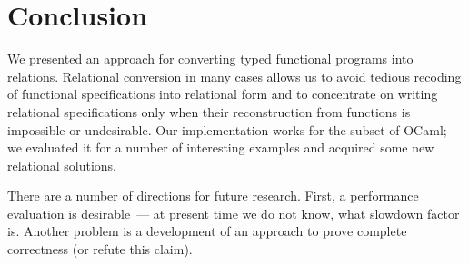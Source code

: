 \section{Conclusion}
\label{conclusion}

We presented an approach for converting typed functional programs into relations. Relational conversion 
in many cases allows us to avoid tedious recoding of functional specifications into relational form and to 
concentrate on writing relational specifications only when their reconstruction from functions is impossible or 
undesirable. Our implementation works for the subset of OCaml; we evaluated it for a number of interesting 
examples and acquired some new relational solutions.

There are a number of directions for future research. First, a performance evaluation is desirable~--- at
present time we do not know, what slowdown factor is. Another problem is a development of an approach to
prove complete correctness (or refute this claim).
